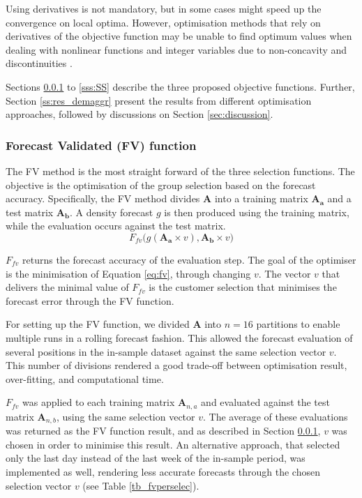 \documentclass[review, 3p, 12pt, authoryear]{elsarticle}
\begin{document}
Using derivatives is not mandatory, but in some cases might speed up the convergence on local optima.
However, optimisation methods that rely on derivatives of the objective function may be unable to find optimum values when dealing with nonlinear functions and integer variables due to non-concavity and discontinuities \citep{genoud}.

Sections \ref{sss:FV} to \ref{sss:SS} describe the three proposed objective functions.
Further, Section \ref{ss:res_demaggr} present the results from different optimisation approaches, followed by discussions on Section \ref{sec:discussion}.

\subsubsection{Forecast Validated (FV) function}
\label{sss:FV}
The FV method is the most straight forward of the three selection functions.
The objective is the optimisation of the group selection based on the forecast accuracy.
Specifically, the FV method divides $\bm{A}$ into a training matrix $\bm{A_a}$ and a test matrix $\bm{A_b}$.
A density forecast $g$ is then produced using the training matrix, while the evaluation occurs against the test matrix.
\begin{equation}
   F_{fv}\big(g(\bm{A_a} \times v),\bm{A_b} \times v \big)
   \label{eq:fv}
\end{equation}

$F_{fv}$ returns the forecast accuracy of the evaluation step.
The goal of the optimiser is the minimisation of Equation \ref{eq:fv}, through changing $v$.
The vector $v$ that delivers the minimal value of $F_{fv}$ is the customer selection that minimises the forecast error through the FV function.

For setting up the FV function, we divided $\bm{A}$ into $n=16$ partitions to enable multiple runs in a rolling forecast fashion.
This allowed the forecast evaluation of several positions in the in-sample dataset against the same selection vector $v$.
This number of divisions rendered a good trade-off between optimisation result, over-fitting, and computational time.

$F_{fv}$ was applied to each training matrix $\bm{A}_{n,a}$ and evaluated against the test matrix $\bm{A}_{n,b}$, using the same selection vector $v$.
The average of these evaluations was returned as the FV function result, and as described in Section \ref{sss:FV}, $v$ was chosen in order to minimise this result.
An alternative approach, that selected only the last day instead of the last week of the in-sample period, was implemented as well, rendering less accurate forecasts through the chosen selection vector $v$ (see Table \ref{tb_fvperselec}).
\end{document}
